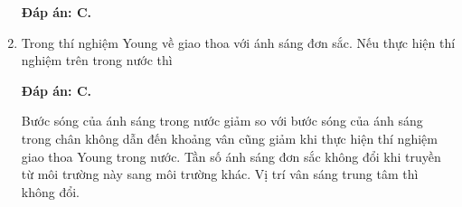 \begin{enumerate}[label=\bfseries Câu \arabic*:]
{		
	}
	
	\loigiai
	{		\textbf{Đáp án: C.}
		
		
		
	}
	\item {} 
	\cauhoi
	{
		Trong thí nghiệm Young về giao thoa với ánh sáng đơn sắc. Nếu thực hiện thí nghiệm trên trong nước thì
		
		
	}
	
	\loigiai
	{		\textbf{Đáp án: C.}
		
		Bước sóng của ánh sáng trong nước giảm so với bước sóng của ánh sáng trong chân không dẫn đến khoảng vân cũng giảm khi thực hiện thí nghiệm giao thoa Young trong nước. Tần số ánh sáng đơn sắc không đổi khi truyền từ môi trường này sang môi trường khác. Vị trí vân sáng trung tâm thì không đổi.
		
	}
\end{enumerate}

